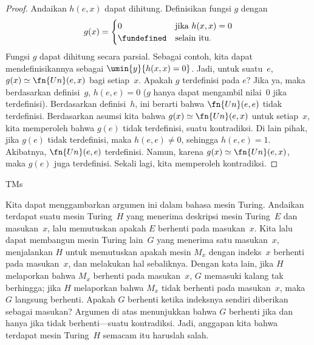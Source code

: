 \documentclass[../../../include/open-logic-section]{subfiles}
\begin{document}
\begin{proof}
Andaikan $h(e,x)$ dapat dihitung. Definisikan fungsi $g$ dengan
\[
g(x) =
\begin{cases}
  0                & \text{jika $h(x,x) = 0$} \\
  \fundefined & \text{selain itu.}
\end{cases}
\]
Fungsi $g$ dapat dihitung secara parsial. Sebagai contoh, kita dapat
mendefinisikannya sebagai $\umin{y}{h(x,x) = 0}$. Jadi, untuk suatu~$e$,
$g(x) \simeq \fn{Un}(e, x)$ bagi setiap~$x$. Apakah $g$ terdefinisi pada $e$?
Jika ya, maka berdasarkan definisi~$g$, $h(e,e) = 0$ ($g$ hanya dapat mengambil
nilai~$0$ jika terdefinisi). Berdasarkan definisi~$h$, ini berarti bahwa
$\fn{Un}(e, e)$ tidak terdefinisi. Berdasarkan asumsi kita bahwa
$g(x) \simeq \fn{Un}(e, x)$ untuk setiap~$x$, kita memperoleh bahwa $g(e)$
tidak terdefinisi, suatu kontradiksi. Di lain pihak, jika $g(e)$ tidak
terdefinisi, maka $h(e,e) \neq 0$, sehingga $h(e,e) = 1$. Akibatnya,
$\fn{Un}(e, e)$ terdefinisi. Namun, karena $g(x) \simeq \fn{Un}(e, x)$, maka
$g(e)$ juga terdefinisi. Sekali lagi, kita memperoleh kontradiksi.
\end{proof}

\begin{tagblock}{TMs}
\begin{explain}
Kita dapat menggambarkan argumen ini dalam bahasa mesin Turing. Andaikan
terdapat suatu mesin Turing~$H$ yang menerima deskripsi mesin Turing~$E$ dan
masukan~$x$, lalu memutuskan apakah $E$ berhenti pada masukan~$x$. Kita lalu
dapat membangun mesin Turing lain~$G$ yang menerima satu masukan~$x$,
menjalankan $H$ untuk memutuskan apakah mesin $M_x$ dengan indeks~$x$ berhenti
pada masukan~$x$, dan melakukan hal sebaliknya. Dengan kata lain, jika $H$
melaporkan bahwa $M_x$ berhenti pada masukan~$x$, $G$ memasuki kalang tak
berhingga; jika $H$ melaporkan bahwa $M_x$ tidak berhenti pada masukan~$x$,
maka $G$ langsung berhenti. Apakah $G$ berhenti ketika indeksnya sendiri
diberikan sebagai masukan? Argumen di atas menunjukkan bahwa $G$ berhenti jika
dan hanya jika tidak berhenti---suatu kontradiksi. Jadi, anggapan kita bahwa
terdapat mesin Turing~$H$ semacam itu haruslah salah.
\end{explain}
\end{tagblock}
\end{document}
